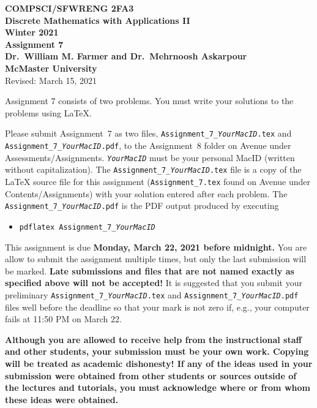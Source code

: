 \documentclass[11pt,fleqn]{article}
\begin{document}
\begin{center}

{\large \textbf{COMPSCI/SFWRENG 2FA3}}\\[2mm]
{\large \textbf{Discrete Mathematics with Applications II}}\\[2mm]
{\large \textbf{Winter 2021}}\\[8mm]
{\huge \textbf{Assignment 7}}\\[6mm]
{\large \textbf{Dr.~William M. Farmer and Dr.~Mehrnoosh Askarpour}}\\[2mm]
{\large \textbf{McMaster University}}\\[6mm]
{\large Revised: March 15, 2021}


\end{center}

\medskip

Assignment 7 consists of two problems.  You must write your solutions
to the problems using LaTeX.

Please submit Assignment~7 as two files,
\texttt{Assignment\_7\_\emph{YourMacID}.tex} and
\texttt{Assignment\_7\_\emph{YourMacID}.pdf}, to the Assignment~8
folder on Avenue under Assessments/Assignments.
\texttt{\emph{YourMacID}} must be your personal MacID (written without
capitalization).  The \texttt{Assignment\_7\_\emph{YourMacID}.tex}
file is a copy of the LaTeX source file for this assignment
(\texttt{Assignment\_7.tex} found on Avenue under
Contents/Assignments) with your solution entered after each problem.
The \texttt{Assignment\_7\_\emph{YourMacID}.pdf} is the PDF output
produced by executing

\begin{itemize}

  \item[] \texttt{pdflatex Assignment\_7\_\emph{YourMacID}}

\end{itemize}

This assignment is due \textbf{Monday, March 22, 2021 before
  midnight.}  You are allow to submit the assignment multiple times,
but only the last submission will be marked.  \textbf{Late submissions
  and files that are not named exactly as specified above will not be
  accepted!}  It is suggested that you submit your preliminary
\texttt{Assignment\_7\_\emph{YourMacID}.tex} and
\texttt{Assignment\_7\_\emph{YourMacID}.pdf} files well before the
deadline so that your mark is not zero if, e.g., your computer fails
at 11:50 PM on March 22.

\textbf{Although you are allowed to receive help from the
  instructional staff and other students, your submission must be your
  own work.  Copying will be treated as academic dishonesty! If any of
  the ideas used in your submission were obtained from other students
  or sources outside of the lectures and tutorials, you must
  acknowledge where or from whom these ideas were obtained.}
\end{document}

